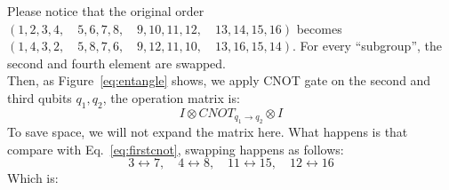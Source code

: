 \documentclass[12pt]{article}
\numberwithin{equation}{section}  %
\theoremstyle{definition}
\theoremstyle{plain}
\theoremstyle{remark}
\begin{document}
Please notice that the original order $(1,2,3,4,\quad5,6,7,8,\quad 9,10,11,12,\quad 13,14,15,16)$ becomes $(1,4,3,2,\quad 5,8,7,6,\quad 9,12,11,10,\quad 13,16,15,14)$. For every ``subgroup'', the second and fourth element are swapped. \\
Then, as Figure~\ref{eq:entangle} shows, we apply CNOT gate on the second and third qubits $q_1,q_2$, the operation matrix is:
\begin{equation*}
    I\otimes CNOT_{q_1\rightarrow q_2}\otimes I
\end{equation*}
To save space, we will not expand the matrix here. What happens is that compare with Eq.~\ref{eq:firstcnot}, swapping happens as follows:
\begin{equation*}
    3\leftrightarrow7,\quad 4\leftrightarrow8,\quad 11\leftrightarrow15,\quad 12\leftrightarrow16
\end{equation*}
Which is:
\end{document}
